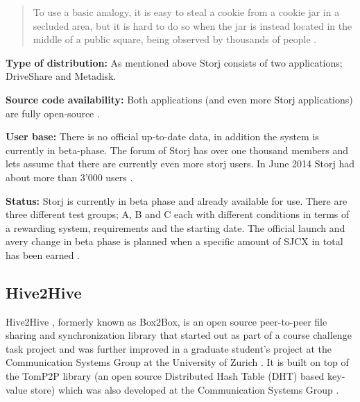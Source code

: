 \begin{quotation}
To use a basic analogy, it is easy to steal a cookie from a cookie jar in a secluded area, but it is hard to do so when the jar is instead located in the middle of a public square, being observed by thousands of people \cite{storj:PDF}.
\end{quotation}

\textbf{Type of distribution:} As mentioned above Storj consists of two applications; DriveShare and Metadisk.

\textbf{Source code availability:} Both applications (and even more Storj applications) are fully open-source \cite{storj:github}.

\textbf{User base:} There is no official up-to-date data, in addition the system is currently in beta-phase. The forum of Storj has over one thousand members \cite{storj:forum} and lets assume that there are currently even more storj users. In June 2014 Storj had about more than 3'000 users \cite{storj:crowdsale}.

\textbf{Status:} Storj is currently in beta phase and already available for use. There are three different test groups; A, B and C each with different conditions in terms of a rewarding system, requirements and the starting date. The official launch and avery change in beta phase is planned when a specific amount of SJCX in total has been earned \cite {storj:earlyaccess}.

\subsection{Hive2Hive} %
Hive2Hive \cite{hive2hive}, formerly known as Box2Box, is an open source peer-to-peer file sharing and synchronization library that started out as part of a course challenge task project and was further improved in a graduate student's project at the Communication Systems Group at the University of Zurich \cite{hive2hive:about}. It is built on top of the TomP2P library (an open source Distributed Hash Table (DHT) based key-value store) which was also developed at the Communication Systems Group \cite{tomp2p}.

